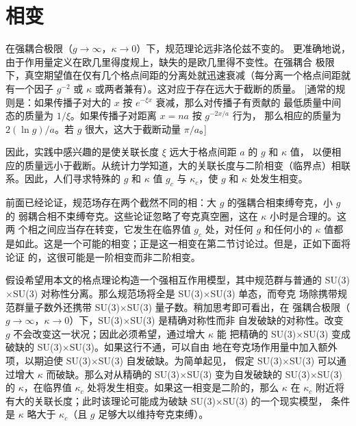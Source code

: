 \section{相变}\label{sec:phases}

在强耦合极限（$g\to\infty$，$\kappa\to0$）下，规范理论远非洛伦兹不变的。
更准确地说，由于作用量定义在欧几里得度规上，缺失的是欧几里得不变性。在强耦合
极限下，真空期望值在仅有几个格点间距的分离处就迅速衰减（每分离一个格点间距就
有一个因子 $g^{-2}$ 或 $\kappa$ 或两者兼有）。这对应于存在远大于截断的质量。
[通常的规则是：如果传播子对大的 $x$ 按 $e^{-\xi x}$ 衰减，那么对传播子有贡献的
最低质量中间态的质量为 $1/\xi$。如果传播子对距离 $x=na$ 按 $g^{-2x/a}$ 行为，
那么相应的质量为 $2(\ln g)/a$。若 $g$ 很大，这大于截断动量 $\pi/a$。]

因此，实践中感兴趣的是使关联长度 $\xi$ 远大于格点间距 $a$ 的 $g$ 和 $\kappa$ 值，
以便相应的质量远小于截断。从统计力学知道，大的关联长度与二阶相变（临界点）相联
系。因此，人们寻求特殊的 $g$ 和 $\kappa$ 值 $g_{c}$ 与 $\kappa_{c}$，使 $g$ 和
$\kappa$ 处发生相变。

前面已经论证，规范场存在两个截然不同的相：大 $g$ 的强耦合相束缚夸克，小 $g$ 的
弱耦合相不束缚夸克。这些论证忽略了夸克真空圈，这在 $\kappa$ 小时是合理的。这两
个相之间应当存在转变，它发生在临界值 $g_{c}$ 处，对任何 $g$ 和任何小的 $\kappa$
值都是如此。这是一个可能的相变；正是这一相变在第二节讨论过。但是，正如下面将论证
的，这很可能是一阶相变而非二阶相变。

假设希望用本文的格点理论构造一个强相互作用模型，其中规范群与普通的
SU(3)$\times$SU(3) 对称性分离。那么规范场将全是 SU(3)$\times$SU(3) 单态，而夸克
场除携带规范群量子数外还携带 SU(3)$\times$SU(3) 量子数。稍加思考即可看出，在
强耦合极限（$g\to\infty$，$\kappa\to0$）下，SU(3)$\times$SU(3) 是精确对称性而非
自发破缺的对称性。改变 $g$ 不会改变这一状况；因此必须希望，通过增大 $\kappa$ 能
把精确的 SU(3)$\times$SU(3) 变成破缺的 SU(3)$\times$SU(3)。如果这行不通，可以自由
地在夸克场作用量中加入额外项，以期迫使 SU(3)$\times$SU(3) 自发破缺。为简单起见，
假定 SU(3)$\times$SU(3) 可以通过增大 $\kappa$ 而破缺。那么对从精确的
SU(3)$\times$SU(3) 变为自发破缺的 SU(3)$\times$SU(3) 的 $\kappa$，在临界值
$\kappa_{c}$ 处将发生相变。如果这一相变是二阶的，那么 $\kappa$ 在 $\kappa_{c}$
附近将有大的关联长度；此时该理论可能成为破缺 SU(3)$\times$SU(3) 的一个现实模型，
条件是 $\kappa$ 略大于 $\kappa_{c}$（且 $g$ 足够大以维持夸克束缚）。

